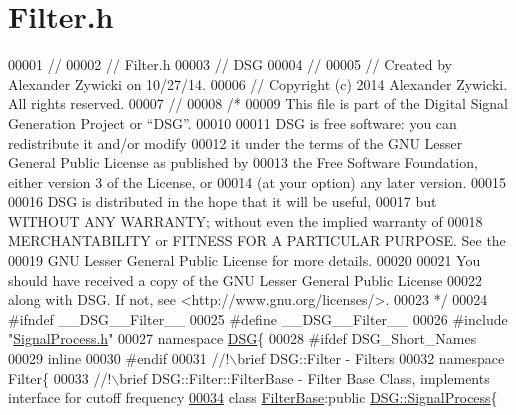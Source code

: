 \hypertarget{_filter_8h_source}{\section{Filter.\+h}
\label{_filter_8h_source}
}

\begin{DoxyCode}
00001 \textcolor{comment}{//}
00002 \textcolor{comment}{//  Filter.h}
00003 \textcolor{comment}{//  DSG}
00004 \textcolor{comment}{//}
00005 \textcolor{comment}{//  Created by Alexander Zywicki on 10/27/14.}
00006 \textcolor{comment}{//  Copyright (c) 2014 Alexander Zywicki. All rights reserved.}
00007 \textcolor{comment}{//}
00008 \textcolor{comment}{/*}
00009 \textcolor{comment}{ This file is part of the Digital Signal Generation Project or “DSG”.}
00010 \textcolor{comment}{}
00011 \textcolor{comment}{ DSG is free software: you can redistribute it and/or modify}
00012 \textcolor{comment}{ it under the terms of the GNU Lesser General Public License as published by}
00013 \textcolor{comment}{ the Free Software Foundation, either version 3 of the License, or}
00014 \textcolor{comment}{ (at your option) any later version.}
00015 \textcolor{comment}{}
00016 \textcolor{comment}{ DSG is distributed in the hope that it will be useful,}
00017 \textcolor{comment}{ but WITHOUT ANY WARRANTY; without even the implied warranty of}
00018 \textcolor{comment}{ MERCHANTABILITY or FITNESS FOR A PARTICULAR PURPOSE.  See the}
00019 \textcolor{comment}{ GNU Lesser General Public License for more details.}
00020 \textcolor{comment}{}
00021 \textcolor{comment}{ You should have received a copy of the GNU Lesser General Public License}
00022 \textcolor{comment}{ along with DSG.  If not, see <http://www.gnu.org/licenses/>.}
00023 \textcolor{comment}{ */}
00024 \textcolor{preprocessor}{#ifndef \_\_DSG\_\_Filter\_\_}
00025 \textcolor{preprocessor}{#define \_\_DSG\_\_Filter\_\_}
00026 \textcolor{preprocessor}{#include "\hyperlink{_signal_process_8h}{SignalProcess.h}"}
00027 \textcolor{keyword}{namespace }\hyperlink{namespace_d_s_g}{DSG}\{
00028 \textcolor{preprocessor}{#ifdef DSG\_Short\_Names}
00029     \textcolor{keyword}{inline}
00030 \textcolor{preprocessor}{#endif}
00031 \textcolor{comment}{    //!\(\backslash\)brief DSG::Filter - Filters}
00032 \textcolor{comment}{}    \textcolor{keyword}{namespace }Filter\{\textcolor{comment}{}
00033 \textcolor{comment}{        //!\(\backslash\)brief DSG::Filter::FilterBase - Filter Base Class, implements interface for cutoff frequency}
\hypertarget{_filter_8h_source_l00034}{}\hyperlink{class_d_s_g_1_1_filter_1_1_filter_base}{00034} \textcolor{comment}{}        \textcolor{keyword}{class }\hyperlink{class_d_s_g_1_1_filter_1_1_filter_base}{FilterBase}:\textcolor{keyword}{public} \hyperlink{class_d_s_g_1_1_signal_process}{DSG::SignalProcess}\{

\end{DoxyCode}
